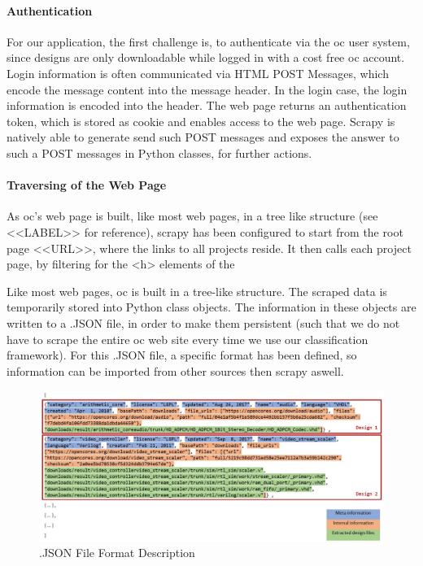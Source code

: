\paragraph*{Authentication \\}

For our application, the first challenge is, to authenticate via the \gls{oc} user system, since designs are only downloadable while logged in with a cost free \gls{oc} account. Login information is often communicated via HTML POST Messages, which encode the message content into the message header. In the login case, the login information is encoded into the header. The web page returns an authentication token, which is stored as cookie and enables access to the web page. Scrapy is natively able to generate send such POST messages and exposes the answer to such a POST messages in Python classes, for further actions. 




\paragraph*{Traversing of the Web Page \\}

As \gls{oc}'s web page is built, like most web pages, in a tree like structure (see <<LABEL>> for reference), scrapy has been configured to start from the root page <<URL>>, where the links to all projects reside. It then calls each project page, by filtering for the <h> elements of the 

Like most web pages, \gls{oc} is built in a tree-like structure.  
The scraped data is temporarily stored into Python class objects. The information 
in these objects are written to a .JSON file, in order to make them persistent (such
that we do not have to scrape the entire \gls{oc} web site every time we use our 
classification framework). For this .JSON file, a specific format has been defined, 
so information can be imported from other sources then scrapy aswell. 

\begin{figure}[h]
	\centering
	\includegraphics[width=\textwidth,keepaspectratio]{../pictures/jsonFileFormatDescription.JPG}
	\caption{.JSON File Format Description}
	\label{fig:jsonFormat}
\end{figure}


